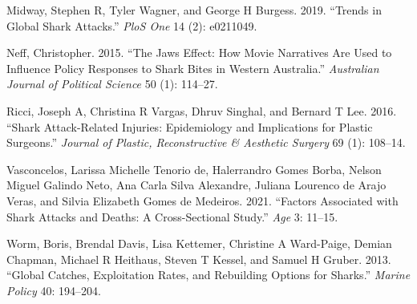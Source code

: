 \documentclass[
  letterpaper,
  DIV=11,
  numbers=noendperiod]{scrartcl}
\newlength{\cslhangindent}
\newenvironment{CSLReferences}[2] %
 {\begin{list}{}{%
  \setlength{\itemindent}{0pt}
  \setlength{\leftmargin}{0pt}
  \setlength{\parsep}{0pt}
  \ifodd #1
   \setlength{\leftmargin}{\cslhangindent}
   \setlength{\itemindent}{-1\cslhangindent}
  \fi
  \setlength{\itemsep}{#2\baselineskip}}}
 {\end{list}}
\begin{document}
\label{refs}
\begin{CSLReferences}{1}{0}
Midway, Stephen R, Tyler Wagner, and George H Burgess. 2019. {``Trends
in Global Shark Attacks.''} \emph{PloS One} 14 (2): e0211049.

Neff, Christopher. 2015. {``The Jaws Effect: How Movie Narratives Are
Used to Influence Policy Responses to Shark Bites in Western
Australia.''} \emph{Australian Journal of Political Science} 50 (1):
114--27.

Ricci, Joseph A, Christina R Vargas, Dhruv Singhal, and Bernard T Lee.
2016. {``Shark Attack-Related Injuries: Epidemiology and Implications
for Plastic Surgeons.''} \emph{Journal of Plastic, Reconstructive \&
Aesthetic Surgery} 69 (1): 108--14.

Vasconcelos, Larissa Michelle Tenorio de, Halerrandro Gomes Borba,
Nelson Miguel Galindo Neto, Ana Carla Silva Alexandre, Juliana Lourenco
de Arajo Veras, and Silvia Elizabeth Gomes de Medeiros. 2021. {``Factors
Associated with Shark Attacks and Deaths: A Cross-Sectional Study.''}
\emph{Age} 3: 11--15.

Worm, Boris, Brendal Davis, Lisa Kettemer, Christine A Ward-Paige,
Demian Chapman, Michael R Heithaus, Steven T Kessel, and Samuel H
Gruber. 2013. {``Global Catches, Exploitation Rates, and Rebuilding
Options for Sharks.''} \emph{Marine Policy} 40: 194--204.

\end{CSLReferences}
\end{document}
